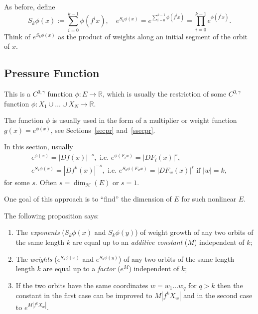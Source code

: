 \documentclass[a4paper]{amsart}
\theoremstyle{plain}
\theoremstyle{definition}
\theoremstyle{remark}
\begin{document}
\bigskip
As before, define
\[
S_k \phi  (x) := \sum_{i=0}^{k-1} \phi (f^i x),\quad e^{S_k \phi  (x) } 
   = e^{\sum_{i=0}^{k-1} \phi (f^i x)} = \prod _{i=0}^{k-1} e^{ \phi (f^i x)}.
   \]
Think of $  e^{S_k \phi  (x) }  $ as the product of weights along an initial segment of the orbit of $ x $.  

\bigskip 






\subsection{Pressure Function}  This is a $ C^{0, \gamma } $ function $ \phi:E \to \mathbb{R} $, which is usually the restriction of some $ C^{0, \gamma } $ function  $ \phi :X_1\cup\dots \cup X_N \to \mathbb{R}  $.

The function $ \phi $ is usually used in the form of a multiplier or weight function $ g(x)= e^{\phi(x)} $, see Sections~\ref{secpr} and~\ref{ssecpr}.


\bigskip In this section, usually 
\begin{equation} \label{}
\begin{gathered}\label{ddfsk}
 e^{\phi(x)} = |Df(x)|^{-s}, \text{ i.e.\ }  e^{\phi(F_ix)} = |DF_i(x)|^s, \\
 e^{S_k\phi(x)} = |Df^k(x)|^{-s}, \text{ i.e.\ }  e^{S_k\phi(F_wx)} = |DF_w(x)|^s  \text{ if } |w|=k,
\end{gathered}
\end{equation} 
for some $ s $. Often $ s = \dim_{\mathcal{H}}(E) $ or $ s=1 $. 

 One goal of this approach is to   ``find''  the dimension of $ E $ for such nonlinear $ E $.
 
 \bigskip  The following proposition says:
  \begin{enumerate}
  \item The \emph{exponents} ($ S_k\phi(x) $ and $ S_k\phi(y) $) of weight growth of any two  orbits of the same length  $ k $   are equal up to an \emph{additive constant} ($ M$) independent of $ k $;
\item The \emph{weights}  ($ e^{S_k\phi(x)} $ and $ e^{S_k\phi(y)} $) of any two orbits  of  the same length length $ k $ are equal up to a \emph{factor} ($ e^M $) independent of $ k $;
  \item If the two orbits have the same coordinates  $ w=w_1\dots w_q $ for $ q > k $ then   the constant in the first case can be improved to  $M| f^k X_w| $ and in the second case to $ e^{M | f^k X_w|} $.
  \end{enumerate} 
\end{document}
